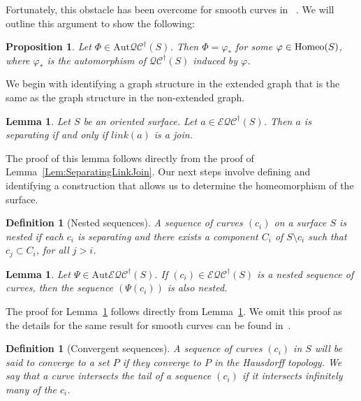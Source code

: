 \documentclass[12pt,a4paper]{amsart}
\theoremstyle{definition}
\theoremstyle{plain}
\newtheorem{proposition}[theorem]{Proposition}
\newtheorem{lemma}[theorem]{Lemma}
\newtheorem{definition}[theorem]{Definition}
\numberwithin{equation}{section}
\newcommand{\eqcg}{\mathcal{E\!QC}^{\dagger}}
\newcommand{\Aut}{\mathrm{Aut}}
\begin{document}
Fortunately, this obstacle has been overcome for smooth curves in ~\cite{booth2024automorphisms}. We will  outline this argument to show the following:

\begin{proposition}\label{prop-auts-come-from-homeos}
    Let $\Phi\in \Aut\mathcal{QC}^{\dagger}(S)$. Then $\Phi = \varphi_{*}$ for some $\varphi \in {\rm{Homeo}}(S)$, where $\varphi_*$ is the automorphism of $\mathcal{QC}^\dagger(S)$ induced by $\varphi$.
\end{proposition}

We begin with identifying a graph structure in the extended graph that is the same as the graph structure in the non-extended graph.

\begin{lemma}\label{Lem:SepCurveinExtendGraph}
    Let $S$ be an oriented surface.  Let $a \in \eqcg(S)$. Then $a$ is separating if and only if $link(a)$ is a join.
\end{lemma}

The proof of this lemma follows directly from the proof of Lemma~\ref{Lem:SeparatingLinkJoin}.  Our next steps involve defining and identifying a construction that allows us to determine the homeomorphism of the surface.

\begin{definition}[Nested sequences]
    A sequence of curves $(c_i)$ on a surface $S$ is {\rm{nested}} if each $c_i$ is separating and there exists a component $C_i$ of $S \setminus c_i$ such that $c_j \subset C_i$, for all $j > i$. 
\end{definition}

\begin{lemma}\label{Lem:NestedCurvesPreserved}
    Let $\Psi \in \Aut \eqcg(S)$. If $(c_i) \in \eqcg(S)$ is a nested sequence of curves, then the sequence $(\Psi(c_i))$ is also nested. 
\end{lemma}

The proof for Lemma~\ref{Lem:NestedCurvesPreserved} follows directly from Lemma~\ref{Lem:SepCurveinExtendGraph}. We omit this proof as the details for the same result for smooth curves can be found in~\cite[Lemma 2.3]{booth2024automorphisms}.

\begin{definition}[Convergent sequences]
    A sequence of curves $(c_i)$ in $S$ will be said to {\rm{converge}} to a set $P$ if they converge to $P$ in the Hausdorff topology.  We say that a curve {\rm{intersects the tail}} of a sequence $(c_i)$ if it intersects infinitely many of the $c_i$. 
\end{definition}
\end{document}
